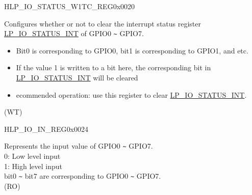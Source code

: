 \begin{register}{H}{LP\_IO\_STATUS\_W1TC\_REG}{0x0020}\label{regdesc:LPIOSTATUSW1TCREG}
%
%
\regnewline%
\begin{regdesc}\begin{reglist}
\label{fielddesc:LPIOSTATUSINTW1TC}\item [LP\_GPIO\_STATUS\_INT\_W1TC] Configures whether or not to clear the interrupt status register \hyperref[fielddesc:LPIOSTATUSINT]{LP\_IO\_STATUS\_INT} of GPIO0 \verb+~+ GPIO7. \\
\begin{itemize}
    \item Bit0 is corresponding to GPIO0, bit1 is corresponding to GPIO1, and etc.
    \item If the value 1 is written to a bit here, the corresponding bit in \hyperref[fielddesc:LPIOSTATUSINT]{LP\_IO\_STATUS\_INT} will be cleared
    \item ecommended operation: use this register to clear \hyperref[fielddesc:LPIOSTATUSINT]{LP\_IO\_STATUS\_INT}. \end{itemize} (WT)
\end{reglist}\end{regdesc}
\end{register}


\begin{register}{H}{LP\_IO\_IN\_REG}{0x0024}\label{regdesc:LPIOINREG}
%
%
\regnewline%
\begin{regdesc}\begin{reglist}
\label{fielddesc:LPIOINNEXT}\item [LP\_GPIO\_IN\_NEXT] Represents the input value of GPIO0 \verb+~+ GPIO7.\\
0: Low level input\\
1: High level input\\
bit0 \verb+~+ bit7 are corresponding to GPIO0 \verb+~+ GPIO7.\\ (RO)
\end{reglist}\end{regdesc}
\end{register}



